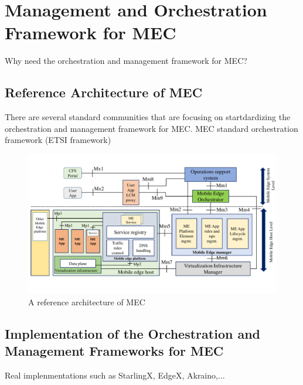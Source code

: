 \section{Management and Orchestration Framework for MEC} \label{framework}

Why need the orchestration and management framework for MEC?


\subsection{Reference Architecture of MEC}

There are several standard communities that are focusing on startdardizing the orchestration and management framework for MEC. 
MEC standard orchestration framework (ETSI framework)


\begin{figure}[h!]
  \begin{center}
   \includegraphics[width=15cm]{./figures/book-etsi-mec.pdf}
   \caption{A reference architecture of MEC}
   \label{fig:etsi-mec}
   \end{center}
\end{figure}

\subsection{Implementation of the Orchestration and Management Frameworks for MEC}

Real implenmentations such as StarlingX, EdgeX, Akraino,... 
